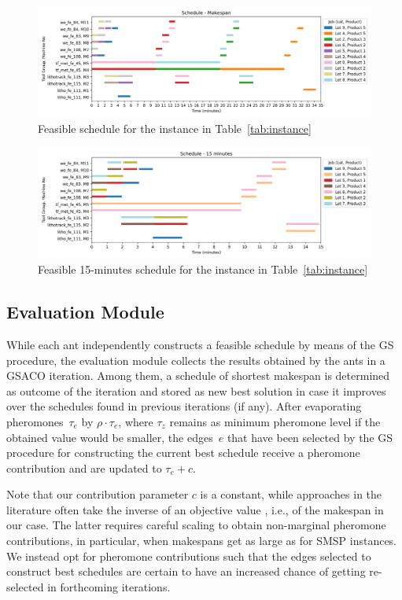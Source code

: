 \begin{figure}[t]
	\includegraphics[width=\textwidth]{schedule_example_makespan.png}
	\caption{Feasible schedule for the instance in Table~\ref{tab:instance}}
	\label{fig:sch-makespan}
\end{figure}
\begin{figure}[ht]
	\includegraphics[width=\textwidth]{schedule_example_operations.png}
	\caption{Feasible 15-minutes schedule for the instance in Table~\ref{tab:instance}}
	\label{fig:sch-operations}
\end{figure}


\subsection{Evaluation Module}
While each ant independently constructs a feasible schedule by means of the
GS procedure, the evaluation module collects the results obtained
by the ants in a GSACO iteration.
Among them, a schedule of shortest makespan is determined as outcome of the
iteration and stored as new best solution in case it improves over the schedules found in previous iterations (if any).
After evaporating pheromones~$\tau_e$ by $\rho\cdot\tau_e$,
where $\tau_z$ remains as minimum pheromone level if the obtained value
would be smaller,
the edges~$e$ that have been selected by the GS procedure for constructing the current best schedule receive a pheromone contribution and are updated to $\tau_e+c$.

Note that our contribution parameter $c$ is a constant,
while approaches in the literature often take the inverse of an objective value
\cite{turkyilmaz2020research}, i.e., of the makespan in our case.
The latter requires careful scaling to obtain non-marginal
pheromone contributions, in particular, when makespans get as large
as for SMSP instances.
We instead opt for pheromone contributions such that the
edges selected to construct best schedules are certain to have an increased chance
of getting re-selected in forthcoming iterations.

